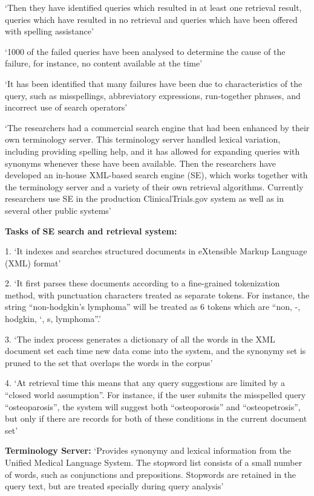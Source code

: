 \documentclass[]{article}
\begin{document}
{{‘Then they have identified queries which resulted in at least one retrieval result, queries which have resulted in no retrieval and queries which have been offered with spelling assistance’

‘1000 of the failed queries have been analysed to determine the cause of the failure, for instance, no content available at the time’

‘It has been identified that many failures have been due to characteristics of the query, such as misspellings, abbreviatory expressions, run-together phrases, and incorrect use of search operators’ 

‘The researchers had a commercial search engine that had been enhanced by their own terminology server. This terminology server handled lexical variation, including providing spelling help, and it has allowed for expanding queries with synonyms whenever these have been available. Then the researchers have developed an in-house XML-based search engine (SE), which works together with the terminology server and a variety of their own retrieval algorithms. Currently researchers use SE in the production ClinicalTrials.gov system as well as in several other public systems’

\textbf{Tasks of SE search and retrieval system:}

1.	‘It indexes and searches structured documents in eXtensible Markup Language (XML) format’

2.	‘It first parses these documents according to a fine-grained tokenization method, with punctuation characters treated as separate tokens. For instance, the string “non-hodgkin’s lymphoma” will be treated as 6 tokens which are “non, -, hodgkin, ‘, s, lymphoma”.’

3.	‘The index process generates a dictionary of all the words in the XML document set each time new data come into the system, and the synonymy set is pruned to the set that overlaps the words in the corpus’

4.	‘At retrieval time this means that any query suggestions are limited by a “closed world assumption”. For instance, if the user submits the misspelled query “osteoparosis”, the system will suggest both “osteoporosis” and “osteopetrosis”, but only if there are records for both of these conditions in the current document set’

\textbf{Terminology Server:} ‘Provides synonymy and lexical information from the Unified Medical Language System. The stopword list consists of a small number of words, such as conjunctions and prepositions. Stopwords are retained in the query text, but are treated specially during query analysis’

}}
\end{document}

